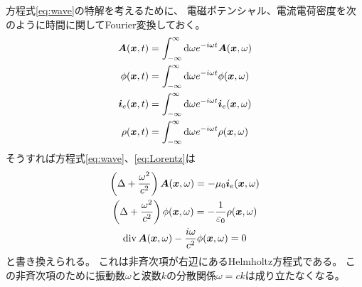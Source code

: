 \documentclass[a4paper, 10pt]{jsarticle}
\theoremstyle{definition}
\def\vec#1{\mbox{\boldmath $#1$}}
\newcommand{\ddif}{{\rm d}}
\DeclareMathOperator{\Div}{div}
\begin{document}
方程式\eqref{eq:wave}の特解を考えるために、
電磁ポテンシャル、電流電荷密度を次のように時間に関してFourier変換しておく。
\begin{gather}
	\vec{A}(\vec{x}, t) = \int_{-\infty}^{\infty} \ddif \omega
	e^{-i\omega t} \vec{A}(\vec{x}, \omega) \\
	\phi(\vec{x}, t) = \int_{-\infty}^{\infty} \ddif \omega
	e^{-i\omega t} \phi(\vec{x}, \omega) \\
	\vec{i}_e(\vec{x}, t) = \int_{-\infty}^{\infty} \ddif \omega
	e^{-i\omega t} \vec{i}_e(\vec{x}, \omega) \\
	\rho(\vec{x}, t) = \int_{-\infty}^{\infty} \ddif \omega
	e^{-i\omega t} \rho(\vec{x}, \omega)
\end{gather}
そうすれば方程式\eqref{eq:wave}、\eqref{eq:Lorentz}は
\begin{gather}
	\begin{gathered}
		\left( \Delta + \frac{\omega^2}{c^2} \right) \vec{A}(\vec{x}, \omega)
		= -\mu_0 \vec{i}_e(\vec{x}, \omega) \\
		\left( \Delta + \frac{\omega^2}{c^2} \right) \phi(\vec{x}, \omega)
		= -\frac{1}{\varepsilon_0} \rho(\vec{x}, \omega)
	\end{gathered} \label{eq:f_wave} \\
	\Div \vec{A}(\vec{x}, \omega) - \frac{i\omega}{c^2} \phi(\vec{x}, \omega) = 0
	\label{eq:f_Lorentz}
\end{gather}
と書き換えられる。
これは非斉次項が右辺にあるHelmholtz方程式である。
この非斉次項のために振動数$\omega$と波数$k$の分散関係$\omega = ck$は成り立たなくなる。
\end{document}
